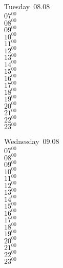\documentclass[11pt, a4paper]{book}\usepackage[]{graphicx}\usepackage[]{color}
\begin{document}
\begin{weekdaybox}
  Tuesday~08.08\\
  { 
  \vfill
  $07^{00}$\\
$08^{00}$\\
$09^{00}$\\
$10^{00}$\\
$11^{00}$\\
$12^{00}$\\
$13^{00}$\\
$14^{00}$\\
$15^{00}$\\
$16^{00}$\\
$17^{00}$\\
$18^{00}$\\
$19^{00}$\\
$20^{00}$\\
$21^{00}$\\
$22^{00}$\\
$23^{00}$\\
  }
\end{weekdaybox}
\begin{weekdaybox}
  Wednesday~09.08\\
  { 
  \vfill
  $07^{00}$\\
$08^{00}$\\
$09^{00}$\\
$10^{00}$\\
$11^{00}$\\
$12^{00}$\\
$13^{00}$\\
$14^{00}$\\
$15^{00}$\\
$16^{00}$\\
$17^{00}$\\
$18^{00}$\\
$19^{00}$\\
$20^{00}$\\
$21^{00}$\\
$22^{00}$\\
$23^{00}$\\
  }
\end{weekdaybox}
\clearpage
\begin{headerbox}
\end{headerbox}
\end{document}
